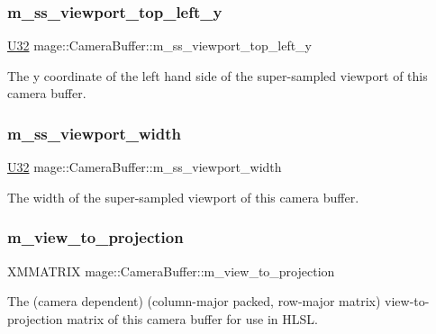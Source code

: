 \subsubsection{\texorpdfstring{m\+\_\+ss\+\_\+viewport\+\_\+top\+\_\+left\+\_\+y}{m\_ss\_viewport\_top\_left\_y}}
{\footnotesize\ttfamily \hyperlink{namespacemage_a41c104c036fba3756a74e19f793eeaa1}{U32} mage\+::\+Camera\+Buffer\+::m\+\_\+ss\+\_\+viewport\+\_\+top\+\_\+left\+\_\+y}

The y coordinate of the left hand side of the super-\/sampled viewport of this camera buffer. \hypertarget{structmage_1_1_camera_buffer_af7a4718829dc96716c4861bbe00bb7e0}{}\label{structmage_1_1_camera_buffer_af7a4718829dc96716c4861bbe00bb7e0} 
\subsubsection{\texorpdfstring{m\+\_\+ss\+\_\+viewport\+\_\+width}{m\_ss\_viewport\_width}}
{\footnotesize\ttfamily \hyperlink{namespacemage_a41c104c036fba3756a74e19f793eeaa1}{U32} mage\+::\+Camera\+Buffer\+::m\+\_\+ss\+\_\+viewport\+\_\+width}

The width of the super-\/sampled viewport of this camera buffer. \hypertarget{structmage_1_1_camera_buffer_aa23d2ecaed10960832215c2397884421}{}\label{structmage_1_1_camera_buffer_aa23d2ecaed10960832215c2397884421} 
\subsubsection{\texorpdfstring{m\+\_\+view\+\_\+to\+\_\+projection}{m\_view\_to\_projection}}
{\footnotesize\ttfamily X\+M\+M\+A\+T\+R\+IX mage\+::\+Camera\+Buffer\+::m\+\_\+view\+\_\+to\+\_\+projection}

The (camera dependent) (column-\/major packed, row-\/major matrix) view-\/to-\/projection matrix of this camera buffer for use in H\+L\+SL. \hypertarget{structmage_1_1_camera_buffer_a2c06f8a346844fb99fadb43d128f9d72}{}\label{structmage_1_1_camera_buffer_a2c06f8a346844fb99fadb43d128f9d72} 
